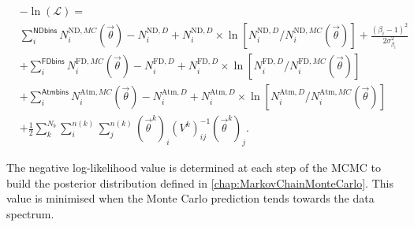 \begin{equation}
  \label{eqn:Likelihood:Likelihood}
  \begin{split}
    &-\ln(\mathcal{L}) = \\ 
    & \sum_{i}^{\mathsf{ND bins}} N_{i}^{\mathrm{ND},MC}(\vec{\theta}) - N_{i}^{\mathrm{ND},D} + N_{i}^{\mathrm{ND},D}  \times \ln \left[ N_{i}^{\mathrm{ND},D}/N_{i}^{\mathrm{ND},MC}(\vec{\theta}) \right] + \frac{(\beta_{i}-1)^{2}}{2\sigma^{2}_{\beta_{i}}} \\
    & +  \sum_{i}^{\mathsf{FD bins}} N_{i}^{\mathrm{FD},MC}(\vec{\theta}) - N_{i}^{\mathrm{FD},D} + N_{i}^{\mathrm{FD},D}  \times \ln \left[ N_{i}^{\mathrm{FD},D}/N_{i}^{\mathrm{FD},MC}(\vec{\theta}) \right] \\
    & +  \sum_{i}^{\mathsf{Atm bins}} N_{i}^{\mathrm{Atm},MC}( \vec{\theta}) - N_{i}^{\mathrm{Atm},D} + N_{i}^{\mathrm{Atm},D} \times  \ln \left[ N_{i}^{\mathrm{Atm},D}/N_{i}^{\mathrm{Atm},MC}(\vec{\theta}) \right] \\
    & + \frac{1}{2} \sum_{k}^{N_{b}} \sum_{i}^{n(k)} \sum_{j}^{n(k)} (\vec{\theta}^{k})_{i} (V^{k})^{-1}_{ij} (\vec{\theta}^{k})_{j}.
  \end{split}
\end{equation}

The negative log-likelihood value is determined at each step of the MCMC to build the posterior distribution defined in \autoref{chap:MarkovChainMonteCarlo}. This value is minimised when the Monte Carlo prediction tends towards the data spectrum.

